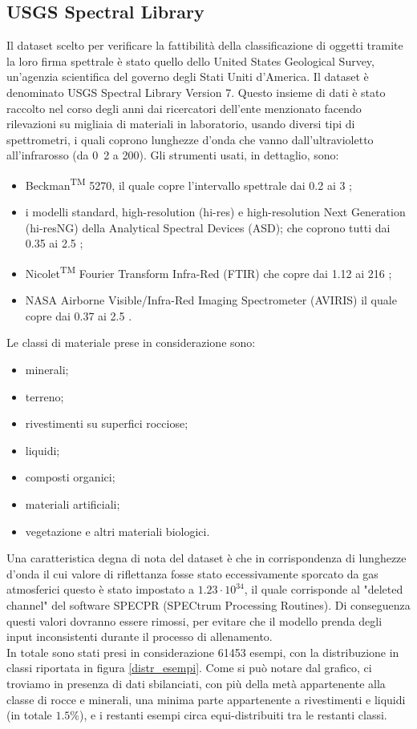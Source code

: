 \subsection{USGS Spectral Library}
Il dataset scelto per verificare la fattibilità della classificazione di oggetti tramite la loro firma spettrale è stato quello dello United States
Geological Survey, un'agenzia scientifica del governo degli Stati Uniti d'America.
Il dataset è denominato USGS Spectral Library Version 7.
Questo insieme di dati è stato raccolto nel corso degli anni dai ricercatori dell'ente menzionato facendo rilevazioni su migliaia di materiali in laboratorio,
usando diversi tipi di spettrometri, i quali coprono lunghezze d'onda che vanno dall'ultravioletto all'infrarosso (da \unit{0.2}{\micro\meter} a \unit{200}{\micro\meter}).
Gli strumenti usati, in dettaglio, sono:
\begin{itemize}
    \item Beckman\textsuperscript{TM} 5270, il quale copre l'intervallo spettrale dai 0.2 ai 3 \micro\meter;
    \item i modelli standard, high-resolution (hi-res) e high-resolution Next Generation (hi-resNG) della Analytical Spectral Devices (ASD);
          che coprono tutti dai 0.35 ai 2.5 \micro\meter;
    \item Nicolet\textsuperscript{TM} Fourier Transform Infra-Red (FTIR) che copre dai 1.12 ai 216 \micro\meter;
    \item NASA Airborne Visible/Infra-Red Imaging Spectrometer (AVIRIS) il quale copre dai 0.37 ai 2.5 \micro\meter.
\end{itemize}
Le classi di materiale prese in considerazione sono:
\begin{itemize}
    \item minerali;
    \item terreno;
    \item rivestimenti su superfici rocciose;
    \item liquidi;
    \item composti organici;
    \item materiali artificiali;
    \item vegetazione e altri materiali biologici.
\end{itemize}
Una caratteristica degna di nota del dataset è che in corrispondenza di lunghezze d'onda il cui valore di riflettanza fosse stato eccessivamente sporcato da gas atmosferici questo è stato impostato a $1.23 \cdot 10^{34}$, il quale corrisponde al "deleted channel" del software SPECPR (SPECtrum Processing Routines). Di conseguenza questi valori dovranno essere rimossi, per evitare che il modello prenda degli input inconsistenti durante il processo di allenamento.\\
In totale sono stati presi in considerazione 61453 esempi, con la distribuzione in classi riportata in figura \ref{distr_esempi}. Come si può notare dal grafico, ci troviamo in presenza di dati sbilanciati, con più della metà appartenente alla classe di rocce e minerali, una minima parte appartenente a rivestimenti e liquidi (in totale $1.5\%$), e i restanti esempi circa equi-distribuiti tra le restanti classi.

